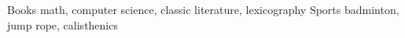 



\begin{cvskills}
  \cvskill
    {Books} %
    {math, computer science, classic literature, lexicography } %
  \cvskill
    {Sports} %
    {badminton, jump rope, calisthenics} %

\end{cvskills}